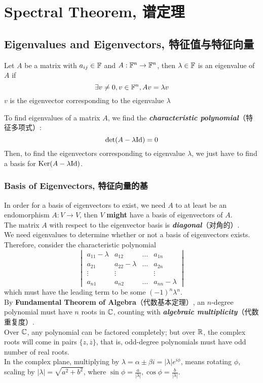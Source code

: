 \section{Spectral Theorem, 谱定理}
\subsection{Eigenvalues and Eigenvectors, 特征值与特征向量}
\begin{definition}
    Let $A$ be a matrix with $a_{ij} \in \mathbb{F}$ and $A: \mathbb{F}^n \to \mathbb{F}^n$, then $\lambda \in \mathbb{F}$ is an eigenvalue of $A$ if
    $$\exists v \ne 0, v \in \mathbb{F}^n, Av = \lambda v$$
    $v$ is the eigenvector corresponding to the eigenvalue $\lambda$
\end{definition}
To find eigenvalues of a matrix $A$, we find the \textbf{\textit{characteristic polynomial}}（特征多项式）:
$$\det (A - \lambda \text{Id}) = 0$$
Then, to find the eigenvectors corresponding to eigenvalue $\lambda$, we just have to find a basis for $\text{Ker} (A - \lambda \text{Id})$.
\subsubsection{Basis of Eigenvectors, 特征向量的基}
In order for a basis of eigenvectors to exist, we need $A$ to at least be an endomorphism $A: V \to V$, then $V$ \textbf{might} have a basis of eigenvectors of $A$. \\
The matrix $A$ with respect to the eigenvector basis is \textbf{\textit{diagonal}}（对角的）. \\
We need eigenvalues to determine whether or not a basis of eigenvectors exists. Therefore, consider the characteristic polynomial
$$\begin{vmatrix}
    a_{11} - \lambda & a_{12} & \dots & a_{1n} \\
    a_{21} & a_{22} - \lambda & \dots & a_{2n} \\
    \vdots & \vdots & & \vdots \\
    a_{n1} & a_{n2} & \dots & a_{nn} - \lambda
\end{vmatrix}$$
which must have the leading term to be some $(-1)^n \lambda^n$. \\
By \textbf{Fundamental Theorem of Algebra}（代数基本定理）, an $n$-degree polynomial must have $n$ roots in $\mathbb{C}$, counting with \textbf{\textit{algebraic multiplicity}}（代数重复度）. \\
Over $\mathbb{C}$, any polynomial can be factored completely; but over $\mathbb{R}$, the complex roots will come in pairs $\{z, \overline{z}\}$, that is, odd-degree polynomials must have odd number of real roots. \\
In the complex plane, multiplying by $\lambda = \alpha \pm \beta i = |\lambda|e^{i\phi}$, means rotating $\phi$, scaling by $|\lambda| = \sqrt{a^2 + b^2}$, where $\sin{\phi} = \frac{a}{|\lambda|}, \cos{\phi} = \frac{b}{|\lambda|}$.
